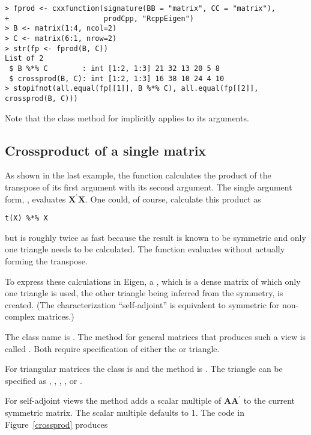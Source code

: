 \documentclass[shortnames,article]{jss}
\begin{document}
\begin{verbatim}
> fprod <- cxxfunction(signature(BB = "matrix", CC = "matrix"), 
+                      prodCpp, "RcppEigen")
> B <- matrix(1:4, ncol=2)
> C <- matrix(6:1, nrow=2)
> str(fp <- fprod(B, C))
List of 2
 $ B %*% C        : int [1:2, 1:3] 21 32 13 20 5 8
 $ crossprod(B, C): int [1:2, 1:3] 16 38 10 24 4 10
> stopifnot(all.equal(fp[[1]], B %*% C), all.equal(fp[[2]], crossprod(B, C)))
\end{verbatim}
Note that the  class method for 
implicitly applies  to its arguments.

\subsection{Crossproduct of a single matrix}
\label{sec:crossproduct}

As shown in the last example, the  function
 calculates the product of the transpose of its first
argument with its second argument.  The single argument form,
, evaluates $\bm X^\prime\bm X$.  One could, of
course, calculate this product as
\begin{verbatim}
t(X) %*% X
\end{verbatim}
but  is roughly twice as fast because the result is
known to be symmetric and only one triangle needs to be calculated.
The function  evaluates 
without actually forming the transpose.

To express these calculations in Eigen, a ,
which is a dense matrix of which only one triangle is used, the other
triangle being inferred from the symmetry, is created.  (The
characterization ``self-adjoint'' is equivalent to symmetric for
non-complex matrices.)

The  class name is .  The method for
general matrices that produces such a view is called
.  Both require specification of either the
 or  triangle.

For triangular matrices the class is  and the
method is .  The triangle can be specified as
, , , ,
 or .

For self-adjoint views the  method adds a scalar multiple
of $\bm A\bm A^\prime$ to the current symmetric matrix.  The scalar
multiple defaults to 1.  The code in Figure~\ref{crossprod} produces
\end{document}
